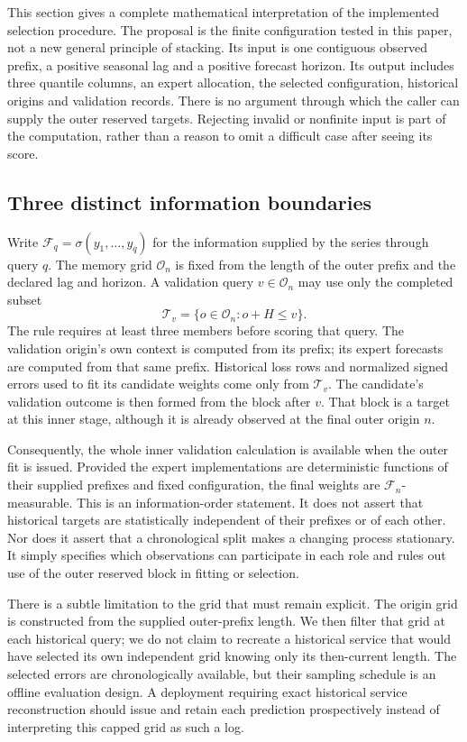 
This section gives a complete mathematical interpretation of the implemented selection procedure. The proposal is the finite configuration tested in this paper, not a new general principle of stacking. Its input is one contiguous observed prefix, a positive seasonal lag and a positive forecast horizon. Its output includes three quantile columns, an expert allocation, the selected configuration, historical origins and validation records. There is no argument through which the caller can supply the outer reserved targets. Rejecting invalid or nonfinite input is part of the computation, rather than a reason to omit a difficult case after seeing its score.

\subsection{Three distinct information boundaries}
Write $\mathcal F_q=\sigma(y_1,\ldots,y_q)$ for the information supplied by the series through query $q$. The memory grid $\mathcal O_n$ is fixed from the length of the outer prefix and the declared lag and horizon. A validation query $v\in\mathcal O_n$ may use only the completed subset
\begin{equation}\label{eq:completed-set}
\mathcal T_v=\{o\in\mathcal O_n:o+H\le v\}.
\end{equation}
The rule requires at least three members before scoring that query. The validation origin's own context is computed from its prefix; its expert forecasts are computed from that same prefix. Historical loss rows and normalized signed errors used to fit its candidate weights come only from $\mathcal T_v$. The candidate's validation outcome is then formed from the block after $v$. That block is a target at this inner stage, although it is already observed at the final outer origin $n$.

Consequently, the whole inner validation calculation is available when the outer fit is issued. Provided the expert implementations are deterministic functions of their supplied prefixes and fixed configuration, the final weights are $\mathcal F_n$-measurable. This is an information-order statement. It does not assert that historical targets are statistically independent of their prefixes or of each other. Nor does it assert that a chronological split makes a changing process stationary. It simply specifies which observations can participate in each role and rules out use of the outer reserved block in fitting or selection.

There is a subtle limitation to the grid that must remain explicit. The origin grid is constructed from the supplied outer-prefix length. We then filter that grid at each historical query; we do not claim to recreate a historical service that would have selected its own independent grid knowing only its then-current length. The selected errors are chronologically available, but their sampling schedule is an offline evaluation design. A deployment requiring exact historical service reconstruction should issue and retain each prediction prospectively instead of interpreting this capped grid as such a log.

